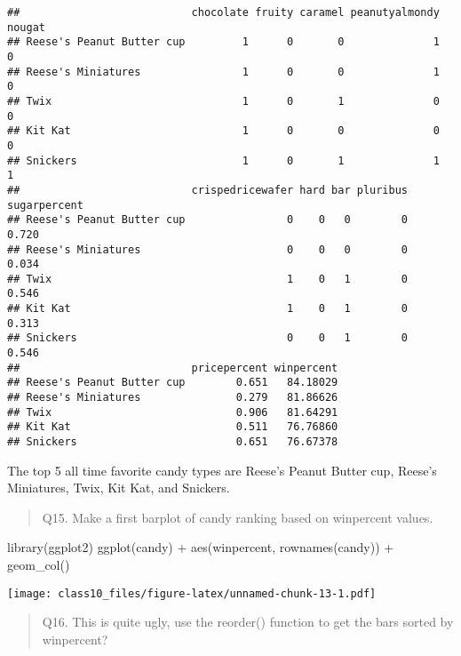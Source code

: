 \documentclass[
]{article}
\newenvironment{Shaded}{\begin{snugshade}}{\end{snugshade}}
\newcommand{\FunctionTok}[1]{\textcolor[rgb]{0.00,0.00,0.00}{#1}}
\newcommand{\NormalTok}[1]{#1}
\newcommand{\SpecialCharTok}[1]{\textcolor[rgb]{0.00,0.00,0.00}{#1}}
\begin{document}
\begin{verbatim}
##                           chocolate fruity caramel peanutyalmondy nougat
## Reese's Peanut Butter cup         1      0       0              1      0
## Reese's Miniatures                1      0       0              1      0
## Twix                              1      0       1              0      0
## Kit Kat                           1      0       0              0      0
## Snickers                          1      0       1              1      1
##                           crispedricewafer hard bar pluribus sugarpercent
## Reese's Peanut Butter cup                0    0   0        0        0.720
## Reese's Miniatures                       0    0   0        0        0.034
## Twix                                     1    0   1        0        0.546
## Kit Kat                                  1    0   1        0        0.313
## Snickers                                 0    0   1        0        0.546
##                           pricepercent winpercent
## Reese's Peanut Butter cup        0.651   84.18029
## Reese's Miniatures               0.279   81.86626
## Twix                             0.906   81.64291
## Kit Kat                          0.511   76.76860
## Snickers                         0.651   76.67378
\end{verbatim}

The top 5 all time favorite candy types are Reese's Peanut Butter cup,
Reese's Miniatures, Twix, Kit Kat, and Snickers.

\begin{quote}
Q15. Make a first barplot of candy ranking based on winpercent values.
\end{quote}

\begin{Shaded}
\begin{Highlighting}[]
\FunctionTok{library}\NormalTok{(ggplot2)}
\FunctionTok{ggplot}\NormalTok{(candy) }\SpecialCharTok{+}
  \FunctionTok{aes}\NormalTok{(winpercent, }\FunctionTok{rownames}\NormalTok{(candy)) }\SpecialCharTok{+}
  \FunctionTok{geom\_col}\NormalTok{()}
\end{Highlighting}
\end{Shaded}

\texttt{[image: class10\_files/figure-latex/unnamed-chunk-13-1.pdf]}

\begin{quote}
Q16. This is quite ugly, use the reorder() function to get the bars
sorted by winpercent?
\end{quote}
\end{document}
